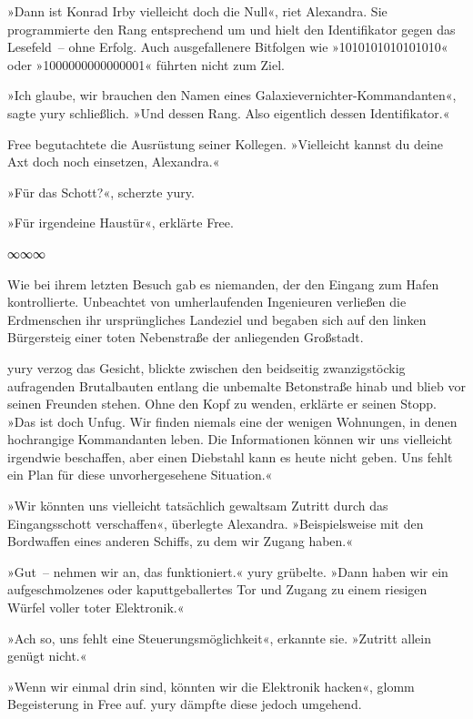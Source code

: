 »Dann ist Konrad Irby vielleicht doch die Null«, riet Alexandra. Sie programmierte den Rang entsprechend um und hielt den Identifikator gegen das Lesefeld~– ohne Erfolg. Auch ausgefallenere Bitfolgen wie »1010101010101010« oder »1000000000000001« führten nicht zum Ziel.

»Ich glaube, wir brauchen den Namen eines Galaxievernichter-Kommandanten«, sagte yury schließlich. »Und dessen Rang. Also eigentlich dessen Identifikator.«

Free begutachtete die Ausrüstung seiner Kollegen. »Vielleicht kannst du deine Axt doch noch einsetzen, Alexandra.«

»Für das Schott?«, scherzte yury.

»Für irgendeine Haustür«, erklärte Free.

\begin{center}
∞∞∞
\end{center}

Wie bei ihrem letzten Besuch gab es niemanden, der den Eingang zum Hafen kontrollierte. Unbeachtet von umherlaufenden Ingenieuren verließen die Erdmenschen ihr ursprüngliches Landeziel und begaben sich auf den linken Bürgersteig einer toten Nebenstraße der anliegenden Großstadt.

yury verzog das Gesicht, blickte zwischen den beidseitig zwanzigstöckig aufragenden Brutalbauten entlang die unbemalte Betonstraße hinab und blieb vor seinen Freunden stehen. Ohne den Kopf zu wenden, erklärte er seinen Stopp. »Das ist doch Unfug. Wir finden niemals eine der wenigen Wohnungen, in denen hochrangige Kommandanten leben. Die Informationen können wir uns vielleicht irgendwie beschaffen, aber einen Diebstahl kann es heute nicht geben. Uns fehlt ein Plan für diese unvorhergesehene Situation.«

»Wir könnten uns vielleicht tatsächlich gewaltsam Zutritt durch das Eingangsschott verschaffen«, überlegte Alexandra. »Beispielsweise mit den Bordwaffen eines anderen Schiffs, zu dem wir Zugang haben.«

»Gut~– nehmen wir an, das funktioniert.« yury grübelte. »Dann haben wir ein aufgeschmolzenes oder kaputtgeballertes Tor und Zugang zu einem riesigen Würfel voller toter Elektronik.«

»Ach so, uns fehlt eine Steuerungsmöglichkeit«, erkannte sie. »Zutritt allein genügt nicht.«

»Wenn wir einmal drin sind, könnten wir die Elektronik hacken«, glomm Begeisterung in Free auf. yury dämpfte diese jedoch umgehend.

